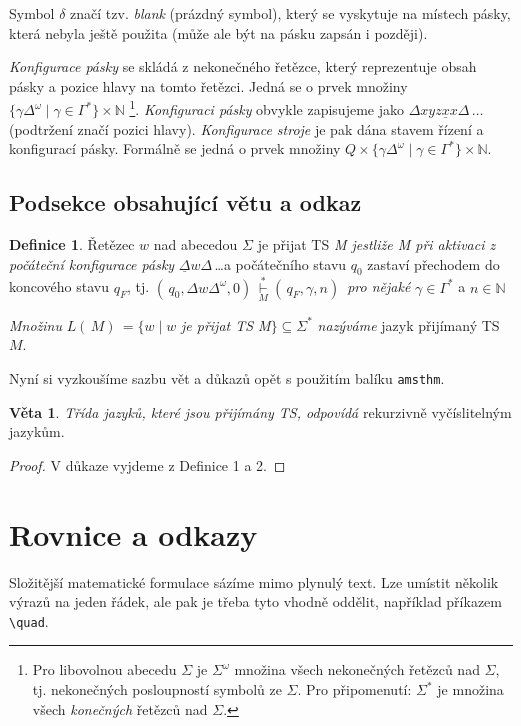 \documentclass[a4paper, 11pt, twocolumn]{article}
\theoremstyle{definition}
\newtheorem{definition}{Definice}
\theoremstyle{definition}
\newtheorem{sentence}{Věta}
\begin{document}
Symbol $\delta$ značí tzv. \emph{blank} (prázdný symbol), který se vyskytuje na místech pásky, která nebyla ještě použita (může ale být na pásku zapsán i později).

\emph{Konfigurace pásky} se skládá z nekonečného řetězce,
který reprezentuje obsah pásky a pozice hlavy na tomto řetězci. Jedná se o prvek množiny $\{\gamma \Delta^\omega\mid\gamma\in\Gamma^*\}\times \mathbb{N}$
\footnote{Pro libovolnou abecedu $\Sigma$ je $\Sigma^\omega$ množina všech nekonečných řetězců nad $\Sigma$, tj. nekonečných posloupností symbolů ze $\Sigma$. Pro připomenutí: $\Sigma^*$ je množina všech \emph{konečných} řetězců nad $\Sigma$.}.
\emph{Konfiguraci pásky} obvykle zapisujeme jako $\Delta xyz\underline{x}x\Delta\,\dots$ (podtržení značí pozici hlavy). \emph{Konfigurace stroje} je pak dána stavem řízení a konfigurací pásky. Formálně se jedná o prvek množiny $Q\times\{\gamma\Delta^\omega\mid\gamma\in\Gamma^*\}\times\mathbb{N}$.

\subsection{Podsekce obsahující větu a odkaz}
\begin{definition}
\label{definice_2}
Řetězec $w$ nad abecedou $\Sigma$ je přijat TS \emph{M jestliže M při aktivaci z počáteční konfigurace pásky} $\underline{\Delta}w\Delta$\,\dots a počátečního stavu $q_0$ zastaví přechodem do koncového stavu $q_F$, tj. $( \,q_0,\Delta w\Delta^\omega,0) \, \overset{*}{\underset{M}{\vdash}} ( \,q_F,\gamma,n) \,$ \emph{pro nějaké} $\gamma\in\Gamma^*$ a $n\in\mathbb{N}$

\emph{Množinu} $L( \,M) \,=\{w\mid w$ \emph{je přijat TS M}$\}\subseteq\Sigma^*$ \emph{nazýváme} jazyk přijímaný TS $M$.
\end{definition}
Nyní si vyzkoušíme sazbu vět a důkazů opět s použitím
balíku \verb|amsthm|.

\begin{sentence}
\label{veta_1}
\emph{Třída jazyků, které jsou přijímány TS, odpovídá} rekurzivně vyčíslitelným jazykům.
\end{sentence}

\begin{proof}
	V důkaze vyjdeme z Definice 1 a 2.
\end{proof}

\section{Rovnice a odkazy}
Složitější matematické formulace sázíme mimo plynulý text. Lze umístit několik výrazů na jeden řádek, ale pak je třeba tyto vhodně oddělit, například příkazem \verb|\quad|.\\
\end{document}
